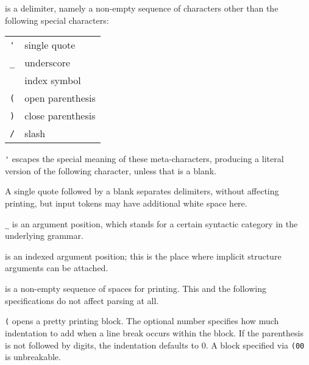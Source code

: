 \begin{isabellebody}
\begin{isamarkuptext}
  \begin{description}

  \item {} is a delimiter, namely a non-empty sequence of
  characters other than the following special characters:

  \smallskip
  \begin{tabular}{ll}
    \verb|'| & single quote \\
    \verb|_| & underscore \\
    \isa{{\isaliteral{22}{\isachardoublequote}}{\isaliteral{5C3C696E6465783E}{\isasymindex}}{\isaliteral{22}{\isachardoublequote}}} & index symbol \\
    \verb|(| & open parenthesis \\
    \verb|)| & close parenthesis \\
    \verb|/| & slash \\
  \end{tabular}
  \medskip

  \item \verb|'| escapes the special meaning of these
  meta-characters, producing a literal version of the following
  character, unless that is a blank.

  A single quote followed by a blank separates delimiters, without
  affecting printing, but input tokens may have additional white space
  here.

  \item \verb|_| is an argument position, which stands for a
  certain syntactic category in the underlying grammar.

  \item {} is an indexed argument position; this is the place
  where implicit structure arguments can be attached.

  \item {} is a non-empty sequence of spaces for printing.
  This and the following specifications do not affect parsing at all.

  \item \verb|(| opens a pretty printing block.  The
  optional number specifies how much indentation to add when a line
  break occurs within the block.  If the parenthesis is not followed
  by digits, the indentation defaults to 0.  A block specified via
  \verb|(00| is unbreakable.


\end{description}
\end{isamarkuptext}
\end{isabellebody}
